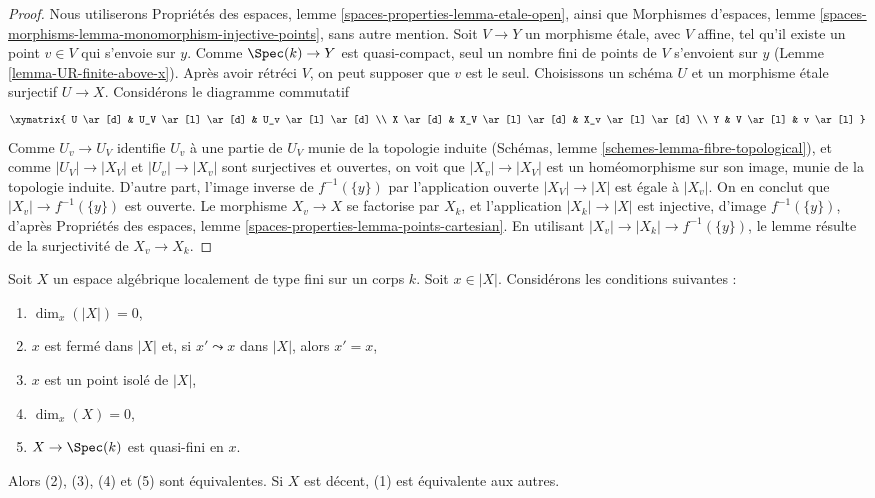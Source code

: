 \begin{proof}
Nous utiliserons
Propriétés des espaces, lemme \ref{spaces-properties-lemma-etale-open},
ainsi que
Morphismes d'espaces, lemme
\ref{spaces-morphisms-lemma-monomorphism-injective-points},
sans autre mention.
Soit $V \to Y$ un morphisme étale, avec $V$ affine, tel qu'il existe un point
$v \in V$ qui s'envoie sur $y$. Comme $\Spec(k) \to Y$ est quasi-compact,
seul un nombre fini de points de $V$ s'envoient sur $y$
(Lemme \ref{lemma-UR-finite-above-x}). Après avoir rétréci
$V$, on peut supposer que $v$ est le seul. Choisissons un schéma $U$ et un
morphisme étale surjectif $U \to X$.
Considérons le diagramme commutatif
$$
\xymatrix{
U \ar[d] & U_V \ar[l] \ar[d] & U_v \ar[l] \ar[d] \\
X \ar[d] & X_V \ar[l] \ar[d] & X_v \ar[l] \ar[d] \\
Y & V \ar[l] & v \ar[l]
}
$$
Comme $U_v \to U_V$ identifie $U_v$ à une partie de $U_V$ munie de la
topologie induite (Schémas, lemme
\ref{schemes-lemma-fibre-topological}),
et comme $|U_V| \to |X_V|$ et $|U_v| \to |X_v|$ sont surjectives et ouvertes,
on voit que $|X_v| \to |X_V|$ est un homéomorphisme sur son image, munie de la
topologie induite.
D'autre part, l'image inverse de $f^{-1}(\{y\})$ par l'application ouverte
$|X_V| \to |X|$ est égale à $|X_v|$.
On en conclut que $|X_v| \to f^{-1}(\{y\})$ est ouverte.
Le morphisme $X_v \to X$ se factorise par $X_k$, et l'application
$|X_k| \to |X|$ est injective, d'image $f^{-1}(\{y\})$, d'après
Propriétés des espaces, lemme
\ref{spaces-properties-lemma-points-cartesian}. En utilisant
$|X_v| \to |X_k| \to f^{-1}(\{y\})$, le lemme résulte de la surjectivité de
$X_v \to X_k$.
\end{proof}

\begin{lemma}
\label{lemma-conditions-on-point-on-space-over-field}
Soit $X$ un espace algébrique localement de type fini sur un corps $k$.
Soit $x \in |X|$. Considérons les conditions suivantes :
\begin{enumerate}
\item $\dim_x(|X|) = 0$,
\item $x$ est fermé dans $|X|$ et, si $x' \leadsto x$  dans $|X|$, alors
$x' = x$,
\item $x$ est un point isolé de $|X|$,
\item $\dim_x(X) = 0$,
\item $X \to \Spec(k)$ est quasi-fini en $x$.
\end{enumerate}
Alors (2), (3), (4) et (5) sont équivalentes.
Si $X$ est décent, (1) est équivalente aux autres.
\end{lemma}


